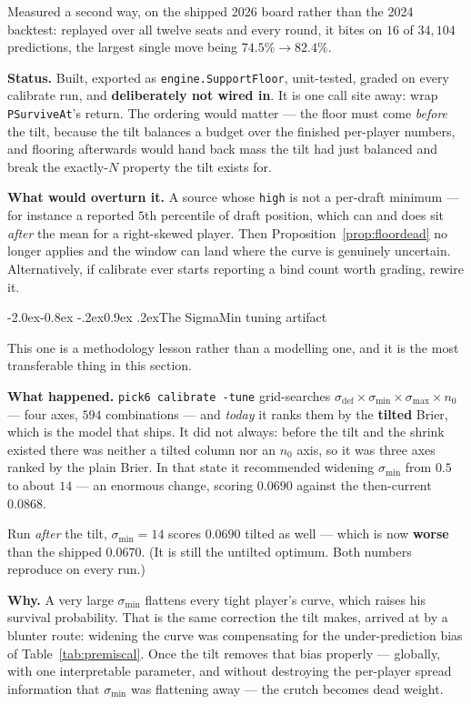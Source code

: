\documentclass[10pt,a4paper]{article}
\makeatletter
\theoremstyle{plain}
\theoremstyle{definition}
\theoremstyle{remark}
\newcommand{\code}[1]{\texttt{\small #1}}
\renewcommand\subsection{\@startsection{subsection}{2}{\z@}%
  {-2.0ex\@plus -0.8ex \@minus -.2ex}{0.9ex \@plus .2ex}{\normalfont\large\bfseries}}
\makeatother
\begin{document}
Measured a second way, on the shipped 2026 board rather than the 2024 backtest: replayed
over all twelve seats and every round, it bites on $16$ of $34{,}104$ predictions, the
largest single move being $74.5\% \to 82.4\%$.

\textbf{Status.} Built, exported as \code{engine.SupportFloor}, unit-tested, graded on
every calibrate run, and \textbf{deliberately not wired in}. It is one call site away:
wrap \code{PSurviveAt}'s return. The ordering would matter --- the floor must come
\emph{before} the tilt, because the tilt balances a budget over the finished per-player
numbers, and flooring afterwards would hand back mass the tilt had just balanced and
break the exactly-$N$ property the tilt exists for.

\textbf{What would overturn it.} A source whose \code{high} is not a per-draft minimum
--- for instance a reported $5$th percentile of draft position, which can and does sit
\emph{after} the mean for a right-skewed player. Then Proposition~\ref{prop:floordead}
no longer applies and the window can land where the curve is genuinely uncertain.
Alternatively, if calibrate ever starts reporting a bind count worth grading, rewire it.

\subsection{The SigmaMin tuning artifact}
\label{sec:tuningartifact}

This one is a methodology lesson rather than a modelling one, and it is the most
transferable thing in this section.

\textbf{What happened.} \code{pick6 calibrate -tune} grid-searches
$\sigma_{\text{def}} \times \sigma_{\min} \times \sigma_{\max} \times n_0$ --- four axes,
$594$ combinations --- and \emph{today} it ranks them by the \textbf{tilted} Brier, which
is the model that ships. It did not always: before the tilt and the shrink existed there
was neither a tilted column nor an $n_0$ axis, so it was three axes ranked by the plain
Brier. In that state it recommended widening $\sigma_{\min}$ from $0.5$ to about $14$ ---
an enormous change, scoring $0.0690$ against the then-current $0.0868$.

Run \emph{after} the tilt, $\sigma_{\min} = 14$ scores $0.0690$ tilted as well --- which
is now \textbf{worse} than the shipped $0.0670$. (It is still the untilted optimum. Both
numbers reproduce on every run.)

\textbf{Why.} A very large $\sigma_{\min}$ flattens every tight player's curve, which
raises his survival probability. That is the same correction the tilt makes, arrived at
by a blunter route: widening the curve was compensating for the under-prediction bias of
Table~\ref{tab:premiscal}. Once the tilt removes that bias properly --- globally, with
one interpretable parameter, and without destroying the per-player spread information
that $\sigma_{\min}$ was flattening away --- the crutch becomes dead weight.
\end{document}
